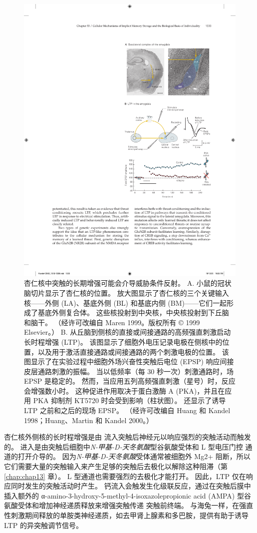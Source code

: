 \begin{figure}[htbp]
	\centering
	\includegraphics[width=0.6\linewidth]{chap53/fig_53_15}
	\caption{杏仁核中突触的长期增强可能会介导威胁条件反射。 A. 小鼠的冠状脑切片显示了杏仁核的位置。 放大图显示了杏仁核的三个关键输入核——外侧 (LA)、基底外侧 (BL) 和基底内侧 (BM)——它们一起形成了基底外侧复合体。 这些核投射到中央核，中央核投射到下丘脑和脑干。 （经许可改编自 Maren 1999。版权所有 © 1999 Elsevier。） B. 从丘脑到侧核的直接或间接通路的高频强直刺激启动长时程增强 (LTP)。 该图显示了细胞外电压记录电极在侧核中的位置，以及用于激活直接通路或间接通路的两个刺激电极的位置。 该图显示了在实验过程中细胞外场兴奋性突触后电位 (EPSP) 响应间接皮层通路刺激的振幅。 当以低频率（每 30 秒一次）刺激通路时，场 EPSP 是稳定的。 然而，当应用五列高频强直刺激（星号）时，反应会增强数小时。 这种促进作用取决于蛋白激酶 A (PKA)，并且在应用 PKA 抑制剂 KT5720 时会受到影响（柱状图）。 还显示了诱导 LTP 之前和之后的现场 EPSP。 （经许可改编自 Huang 和 Kandel 1998；Huang、Martin 和 Kandel 2000。）}
	\label{fig:53_15}
\end{figure}


杏仁核外侧核的长时程增强是由  流入突触后神经元以响应强烈的突触活动而触发的。
 进入是由突触后细胞中\textit{N-甲基-D-天冬氨酸}型谷氨酸受体和 L 型电压门控  通道的打开介导的。
因为\textit{N-甲基-D-天冬氨酸}受体通常被细胞外 Mg2+ 阻断，所以它们需要大量的突触输入来产生足够的突触后去极化以解除这种阻滞（第 \ref{chap:chap13} 章）。
L 型通道也需要强烈的去极化才能打开。 因此，LTP 仅在响应同时发生的突触活动时产生。
钙流入会触发生化级联反应，通过在突触后膜中插入额外的 α-amino-3-hydroxy-5-methyl-4-isoxazolepropionic acid (AMPA) 型谷氨酸受体和增加神经递质释放来增强突触传递 突触前终端。
与海兔一样，在强直性刺激期间释放的单胺类神经递质，如去甲肾上腺素和多巴胺，提供有助于诱导 LTP 的异突触调节信号。


